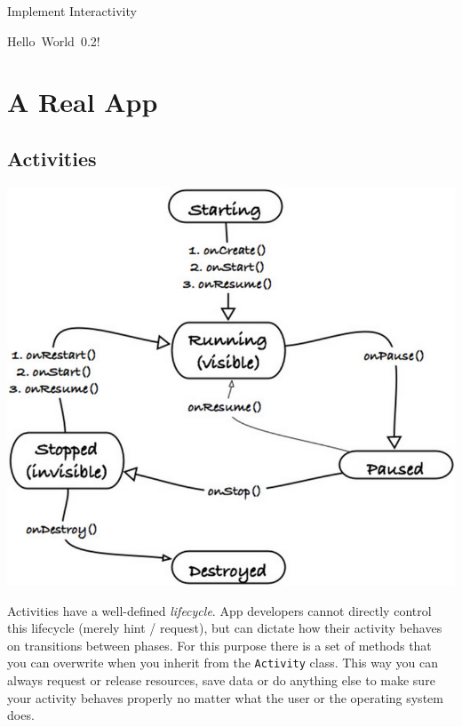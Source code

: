\documentclass[a4paper,slides=slides,handouts=handouts]{mh-presentation}       %
\begin{document}
	\begin{slide}
		{\Huge Implement Interactivity}
		
		\pause
		
		\vspace{3mm}
		
		{\Huge Hello~World~0.2!}
	\end{slide}
	
	\showPreviousSlide\showThisSlide

\section{A Real App} %

\subsection{Activities}%
	
	\begin{slide}
		\includegraphics[scale=.25]{activitylifecycle.png}
	\end{slide}
	
	\begin{summary}
		Activities have a well-defined \emph{lifecycle}. App developers cannot directly
		control this lifecycle (merely hint / request), but can dictate how their
		activity behaves on transitions between phases. For this purpose there is a set
		of methods that you can overwrite when you inherit from the \verb~Activity~
		class. This way you can always request or release resources, save data
		or do anything else to make sure your activity behaves properly no matter
		what the user or the operating system does.
	\end{summary}
	
\end{document}
